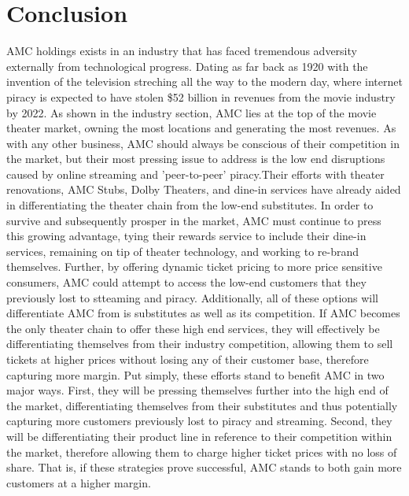 \documentclass[12pt]{article}
\begin{document}
\section{Conclusion}
AMC holdings exists in an industry that has faced tremendous adversity externally from technological progress. Dating as far back as 1920 with the invention of the television streching all the way to the modern day, where internet piracy is expected to have stolen \$52 billion in revenues from the movie industry by 2022. As shown in the industry section, AMC lies at the top of the movie theater market, owning the most locations and generating the most revenues. As with any other business, AMC should always be conscious of their competition in the market, but their most pressing issue to address is the low end disruptions caused by online streaming and 'peer-to-peer' piracy.Their efforts with theater renovations, AMC Stubs, Dolby Theaters, and dine-in services have already aided in differentiating the theater chain from the low-end substitutes. In order to survive and subsequently prosper in the market, AMC must continue to press this growing advantage, tying their rewards service to include their dine-in services, remaining on tip of theater technology, and working to re-brand themselves. Further, by offering dynamic ticket pricing to more price sensitive consumers, AMC could attempt to access the low-end customers that they previously lost to stteaming and piracy. Additionally, all of these options will differentiate AMC from is substitutes as well as its competition. If AMC becomes the only theater chain to offer these high end services, they will effectively be differentiating themselves from their industry competition, allowing them to sell tickets at higher prices without losing any of their customer base, therefore capturing more margin. Put simply, these efforts stand to benefit AMC in two major ways. First, they will be pressing themselves further into the high end of the market, differentiating themselves from their substitutes and thus potentially capturing more customers previously lost to piracy and streaming. Second, they will be differentiating their product line in reference to their competition within the market, therefore allowing them to charge higher ticket prices with no loss of share. That is, if these strategies prove successful, AMC stands to both gain more customers at a higher margin. 
\end{document}
